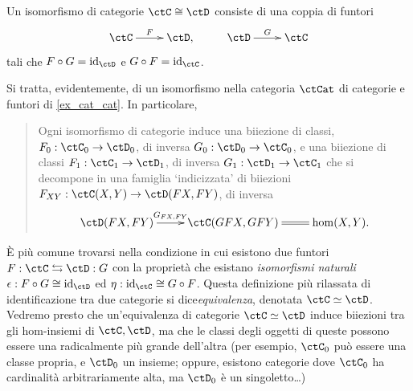 \begin{definition}\label{fun_isocat}
	Un isomorfismo di categorie \(\ctC\cong\ctD\) consiste di una coppia di funtori
	\[\xymatrix{
			\ctC \ar[r]^-F & \ctD, & \ctD \ar[r]^-G & \ctC
		}\]
	tali che \(F\cmp G = \Id[\ctD]\) e \(G\cmp F = \Id[\ctC]\).

	Si tratta, evidentemente, di un isomorfismo nella categoria \(\ctCat\) di categorie e funtori di \ref{ex_cat_cat}. In particolare,
	\begin{quote}
		Ogni isomorfismo di categorie induce una biiezione di classi, \(F_0 : \ctC_0\to\ctD_0\), di inversa \(G_0 : \ctD_0\to\ctC_0\), e una biiezione di classi \(F_1 : \ctC_1 \to \ctD_1\), di inversa \(G_1 : \ctD_1\to\ctC_1\) che si decompone in una famiglia `indicizzata' di biiezioni \(F_{XY} : \Hom\ctC(X,Y)\to\Hom\ctD(FX,FY)\), di inversa
		\[\xymatrix{
			\Hom\ctD(FX,FY) \ar[r]^-{G_{FX,FY}} & \Hom\ctC(GFX,GFY) \ar@{=}[r] & \hom(X,Y).
			}\]
	\end{quote}
\end{definition}
\`E più comune trovarsi nella condizione in cui esistono due funtori \(F : \ctC \leftrightarrows \ctD: G\) con la proprietà che esistano \emph{isomorfismi naturali} \(\epsilon : F\cmp G \cong \Id[\ctD]\) ed \(\eta : \Id[\ctC]\cong G\cmp F\). Questa definizione più rilassata di identificazione tra due categorie si dice\emph{equivalenza}, denotata \(\ctC\simeq\ctD\). Vedremo presto che un'equivalenza di categorie \(\ctC\simeq\ctD\) induce biiezioni tra gli hom-insiemi di \(\ctC,\ctD\), ma che le classi degli oggetti di queste possono essere una radicalmente più grande dell'altra (per esempio, \(\ctC_0\) può essere una classe propria, e \(\ctD_0\) un insieme; oppure, esistono categorie dove \(\ctC_0\) ha cardinalità arbitrariamente alta, ma \(\ctD_0\) è un singoletto\dots)

